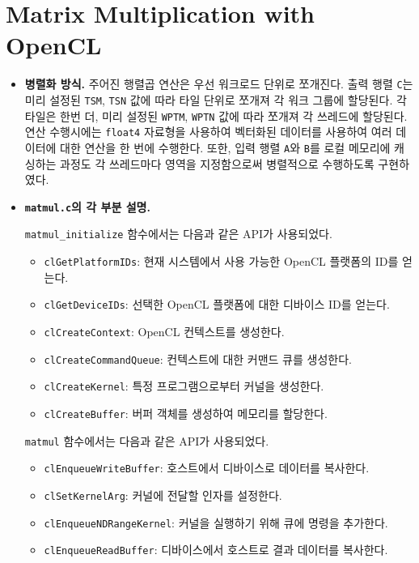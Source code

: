 \section{Matrix Multiplication with OpenCL}

\begin{itemize}

    \item {
        \textbf{병렬화 방식.}
        주어진 행렬곱 연산은 우선 워크로드 단위로 쪼개진다. 출력 행렬 \texttt{C}는 미리 설정된 \texttt{TSM}, \texttt{TSN}
        값에 따라 타일 단위로 쪼개져 각 워크 그룹에 할당된다. 각 타일은 한번 더, 미리 설정된 \texttt{WPTM}, \texttt{WPTN}
        값에 따라 쪼개져 각 쓰레드에 할당된다. 연산 수행시에는 \texttt{float4} 자료형을 사용하여 벡터화된 데이터를 사용하여
        여러 데이터에 대한 연산을 한 번에 수행한다. 또한, 입력 행렬 \texttt{A}와 \texttt{B}를 로컬 메모리에 캐싱하는 과정도
        각 쓰레드마다 영역을 지정함으로써 병렬적으로 수행하도록 구현하였다.
    }

    \item{
    
        \textbf{\texttt{matmul.c}의 각 부분 설명.}

        \texttt{matmul\_initialize} 함수에서는 다음과 같은 API가 사용되었다.
        
        \begin{itemize}
            \item \texttt{clGetPlatformIDs}: 현재 시스템에서 사용 가능한 OpenCL 플랫폼의 ID를 얻는다.
            \item \texttt{clGetDeviceIDs}: 선택한 OpenCL 플랫폼에 대한 디바이스 ID를 얻는다.
            \item \texttt{clCreateContext}: OpenCL 컨텍스트를 생성한다.
            \item \texttt{clCreateCommandQueue}: 컨텍스트에 대한 커맨드 큐를 생성한다.
            \item \texttt{clCreateKernel}: 특정 프로그램으로부터 커널을 생성한다.
            \item \texttt{clCreateBuffer}: 버퍼 객체를 생성하여 메모리를 할당한다.
        \end{itemize}

        \texttt{matmul} 함수에서는 다음과 같은 API가 사용되었다.
        
        \begin{itemize}
            \item \texttt{clEnqueueWriteBuffer}: 호스트에서 디바이스로 데이터를 복사한다.
            \item \texttt{clSetKernelArg}: 커널에 전달할 인자를 설정한다.
            \item \texttt{clEnqueueNDRangeKernel}: 커널을 실행하기 위해 큐에 명령을 추가한다.
            \item \texttt{clEnqueueReadBuffer}: 디바이스에서 호스트로 결과 데이터를 복사한다.
        \end{itemize}

}
\end{itemize}
